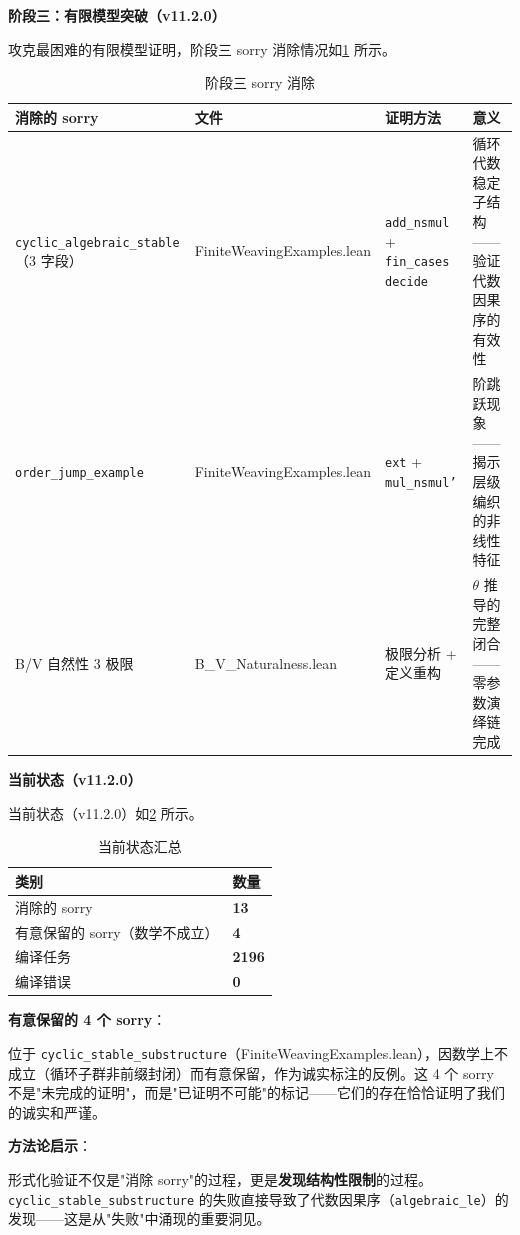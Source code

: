 \documentclass[aps,prd,twocolumn,nofootinbib,floatfix]{revtex4-2}
\begin{document}
\textbf{阶段三：有限模型突破（v11.2.0）}

攻克最困难的有限模型证明，阶段三 sorry 消除情况如\cref{tab:sorry3} 所示。

\begin{table}[!t]
\centering
\scriptsize
\begin{tabular}{p{4cm}p{4cm}p{4cm}p{4cm}}
\hline
消除的 sorry & 文件 & 证明方法 & 意义 \\
\hline
\texttt{cyclic\_algebraic\_stable}（3 字段） & FiniteWeavingExamples.lean & \texttt{add\_nsmul} + \texttt{fin\_cases decide} & 循环代数稳定子结构——验证代数因果序的有效性 \\
\texttt{order\_jump\_example} & FiniteWeavingExamples.lean & \texttt{ext} + \texttt{mul\_nsmul'} & 阶跳跃现象——揭示层级编织的非线性特征 \\
B/V 自然性 3 极限 & B\_V\_Naturalness.lean & 极限分析 + 定义重构 & $\theta$ 推导的完整闭合——零参数演绎链完成 \\
\hline
\end{tabular}
\caption{阶段三 sorry 消除}
\label{tab:sorry3}
\end{table}

\textbf{当前状态（v11.2.0）}

当前状态（v11.2.0）如\cref{tab:current} 所示。

\begin{table}[!t]
\centering
\begin{tabular}{ll}
\hline
类别 & 数量 \\
\hline
消除的 sorry & \textbf{13} \\
有意保留的 sorry（数学不成立） & \textbf{4} \\
编译任务 & \textbf{2196} \\
编译错误 & \textbf{0} \\
\hline
\end{tabular}
\caption{当前状态汇总}
\label{tab:current}
\end{table}

\textbf{有意保留的 4 个 sorry}：

位于 \texttt{cyclic\_stable\_substructure}（FiniteWeavingExamples.lean），因数学上不成立（循环子群非前缀封闭）而有意保留，作为诚实标注的反例。这 4 个 sorry 不是"未完成的证明"，而是"已证明不可能"的标记——它们的存在恰恰证明了我们的诚实和严谨。

\textbf{方法论启示}：

形式化验证不仅是"消除 sorry"的过程，更是\textbf{发现结构性限制}的过程。\texttt{cyclic\_stable\_substructure} 的失败直接导致了代数因果序（\texttt{algebraic\_le}）的发现——这是从"失败"中涌现的重要洞见。
\end{document}
